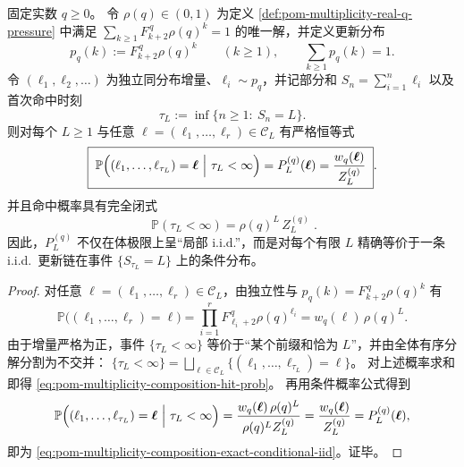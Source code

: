 \begin{theorem}\label{thm:pom-multiplicity-composition-exact-conditional-iid}
固定实数 \(q\ge 0\)。
令 \(\rho(q)\in(0,1)\) 为定义 \ref{def:pom-multiplicity-real-q-pressure} 中满足
\(
\sum_{k\ge 1}F_{k+2}^{\,q}\rho(q)^k=1
\)
的唯一解，并定义更新分布
\[
p_q(k):=F_{k+2}^{\,q}\rho(q)^k\qquad(k\ge 1),
\qquad
\sum_{k\ge 1}p_q(k)=1.
\]
令 \((\ell_1,\ell_2,\dots)\) 为独立同分布增量、\(\ell_i\sim p_q\)，并记部分和 \(S_n=\sum_{i=1}^n\ell_i\) 以及首次命中时刻
\[
\tau_L:=\inf\{n\ge 1:\ S_n=L\}.
\]
则对每个 \(L\ge 1\) 与任意 \(\boldsymbol{\ell}=(\ell_1,\dots,\ell_r)\in\mathcal{C}_L\) 有严格恒等式
\begin{equation}\label{eq:pom-multiplicity-composition-exact-conditional-iid}
\boxed{\;
\mathbb{P}\Bigl((\ell_1,\dots,\ell_{\tau_L})=\boldsymbol{\ell}\ \Big|\ \tau_L<\infty\Bigr)
=P_L^{(q)}(\boldsymbol{\ell})
=\frac{w_q(\boldsymbol{\ell})}{Z_L^{(q)}}\; }.
\end{equation}
并且命中概率具有完全闭式
\begin{equation}\label{eq:pom-multiplicity-composition-hit-prob}
\boxed{\;
\mathbb{P}(\tau_L<\infty)=\rho(q)^{L}\,Z_L^{(q)}\; }.
\end{equation}
因此，\(P_L^{(q)}\) 不仅在体极限上呈“局部 i.i.d.”，而是对每个有限 \(L\) 精确等价于一条 i.i.d.\ 更新链在事件 \(\{S_{\tau_L}=L\}\) 上的条件分布。
\end{theorem}
\begin{proof}
对任意 \(\boldsymbol{\ell}=(\ell_1,\dots,\ell_r)\in\mathcal{C}_L\)，由独立性与 \(p_q(k)=F_{k+2}^{\,q}\rho(q)^k\) 有
\[
\mathbb{P}\bigl((\ell_1,\dots,\ell_r)=\boldsymbol{\ell}\bigr)
=\prod_{i=1}^r F_{\ell_i+2}^{\,q}\rho(q)^{\ell_i}
=w_q(\boldsymbol{\ell})\,\rho(q)^L.
\]
由于增量严格为正，事件 \(\{\tau_L<\infty\}\) 等价于“某个前缀和恰为 \(L\)”，并由全体有序分解分割为不交并：
\(
\{\tau_L<\infty\}=\bigsqcup_{\boldsymbol{\ell}\in\mathcal{C}_L}\{(\ell_1,\dots,\ell_{\tau_L})=\boldsymbol{\ell}\}
\)。
对上述概率求和即得 \eqref{eq:pom-multiplicity-composition-hit-prob}。
再用条件概率公式得到
\[
\mathbb{P}\Bigl((\ell_1,\dots,\ell_{\tau_L})=\boldsymbol{\ell}\ \Big|\ \tau_L<\infty\Bigr)
=\frac{w_q(\boldsymbol{\ell})\,\rho(q)^L}{\rho(q)^L Z_L^{(q)}}
=\frac{w_q(\boldsymbol{\ell})}{Z_L^{(q)}}
=P_L^{(q)}(\boldsymbol{\ell}),
\]
即为 \eqref{eq:pom-multiplicity-composition-exact-conditional-iid}。证毕。
\end{proof}

